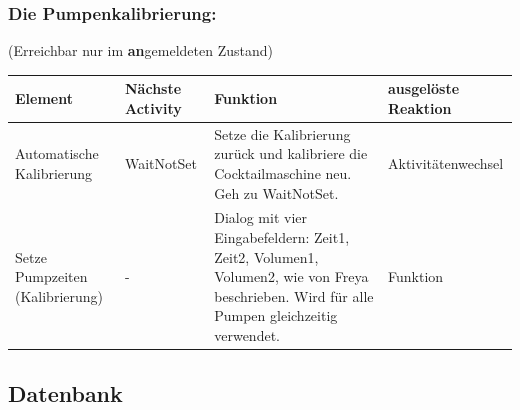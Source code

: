 \subsubsection{Die Pumpenkalibrierung:}
(Erreichbar nur im \textbf{an}gemeldeten Zustand)
\begin{table}[!ht]
	\centering
	\begin{tabular}{|l|l|l|l|}
		\hline
		\textbf{Element } & \textbf{Nächste Activity } & \textbf{Funktion } & \textbf{ausgelöste Reaktion} \\ \hline
		Automatische Kalibrierung  & WaitNotSet  & Setze die Kalibrierung zurück und kalibriere die Cocktailmaschine neu. Geh zu WaitNotSet.  & Aktivitätenwechsel \\ \hline
		Setze Pumpzeiten (Kalibrierung)  & -  & Dialog mit vier Eingabefeldern: Zeit1, Zeit2, Volumen1, Volumen2, wie von Freya beschrieben. Wird für alle Pumpen gleichzeitig verwendet.  & Funktion \\ \hline
	\end{tabular}
\end{table}




\subsection{Datenbank}

